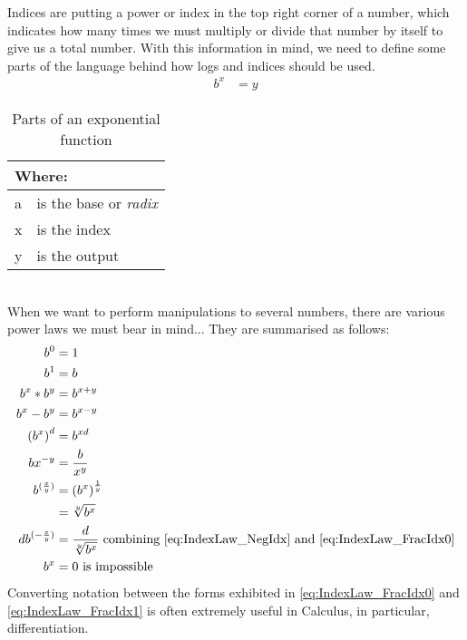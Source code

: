 Indices are putting a power or index in the top right corner of a number,
which indicates how many times we must multiply or divide that number by
itself to give us a total number. With this information in mind, we need to
define some parts of the language behind how logs and indices should be
used.
\begin{align}
  {b}^{x} & = y
  \label{eq:IdxForm}
\end{align}
\begin{table}[!hbt]
\label{tab:PartsOfAnExponential}
\begin{tabularx}{\linewidth}{| l X |}
\hline
\multicolumn{2}{|l|}{Where:} \\
\hline \hline
a & is the base or \emph{radix}\\
x & is the index\\
y & is the output\\
\hline
\end{tabularx}
\caption{Parts of an exponential function}
\end{table}
\\
When we want to perform manipulations to several numbers, there are various
power laws we must bear in mind... They are summarised as follows:
\begin{align}
  {b}^{0}               & = 1 \label{eq:IndexLaw_Power0} \\
  {b}^{1}               & = b \label{eq:IndexLaw_Power1} \\
  {b}^{x} * {b}^{y}     & = {b}^{x+y} \label{eq:IndexLaw_AddIdxs} \\
  {b}^{x} - {b}^{y}     & = {b}^{x-y} \label{eq:IndexLaw_SubIdxs} \\
  {({b}^{x})}^{d}       & = {b}^{xd} \label{eq:IndexLaw_MultIdxs} \\
  b{x}^{-y}             & = \frac{b}{{x}^{y}} \label{eq:IndexLaw_NegIdx} \\
  {b}^{(\frac{x}{y})}   & = {({b}^{x})}^{\frac{1}{y}}
                            \label{eq:IndexLaw_FracIdx0} \\
                        & = \sqrt[y]{{b}^{x}} \label{eq:IndexLaw_FracIdx1}\\
  d{b}^{(-\frac{x}{y})} & = \frac{d}{\sqrt[y]{{b}^{x}}} ~ \text{combining \eqref{eq:IndexLaw_NegIdx} and \eqref{eq:IndexLaw_FracIdx0}} \\
  {b}^{x}               & = 0 ~ \text{is impossible} \label{eq:IndexLaw_EqualsZero}
\end{align}
Converting notation between the forms exhibited in
\ref{eq:IndexLaw_FracIdx0} and \ref{eq:IndexLaw_FracIdx1} is often
extremely useful in Calculus, in particular, differentiation.

